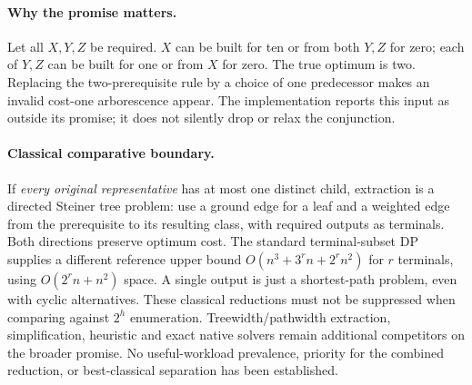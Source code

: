 \paragraph{Why the promise matters.}
Let all $X,Y,Z$ be required. $X$ can be built for ten or from both $Y,Z$ for
zero; each of $Y,Z$ can be built for one or from $X$ for zero. The true optimum
is two. Replacing the two-prerequisite rule by a choice of one predecessor makes
an invalid cost-one arborescence appear. The implementation reports this input
as outside its promise; it does not silently drop or relax the conjunction.

\paragraph{Classical comparative boundary.}
If \emph{every original representative} has at most one distinct child, extraction
is a directed Steiner tree problem: use a ground edge for a leaf and a weighted
edge from the prerequisite to its resulting class, with required outputs as
terminals. Both directions preserve optimum cost. The standard terminal-subset
DP supplies a different reference upper bound
$O(n^3+3^r n+2^r n^2)$ for $r$ terminals, using $O(2^r n+n^2)$ space.
A single output is just a shortest-path problem, even with cyclic alternatives.
These classical reductions must not be suppressed when comparing against
$2^h$ enumeration. Treewidth/pathwidth extraction, simplification, heuristic
and exact native solvers remain additional competitors on the broader promise.
No useful-workload prevalence, priority for the combined reduction, or
best-classical separation has been established.
